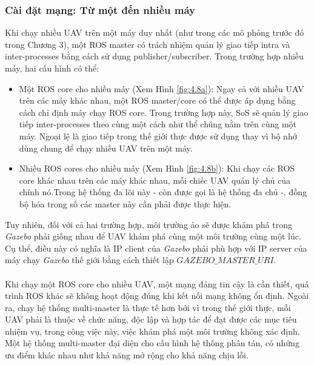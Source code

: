 \documentclass[11pt,openany]{book}
\begin{document}
\subsubsection{Cài đặt mạng: Từ một đến nhiều máy}
Khi chạy nhiều UAV trên một máy duy nhất (như trong các mô phỏng trước đó trong Chương 3), một ROS master có trách nhiệm quản lý giao tiếp intra và inter-processes bằng cách sử dụng publisher/subscriber. Trong trường hợp nhiều máy, hai cấu hình có thể:
\begin{itemize}
    \item Một ROS core cho nhiều máy (Xem Hình \ref{fig:4.8a}): Ngay cả với nhiều UAV trên các máy khác nhau, một ROS master/core có thể được áp dụng bằng cách chỉ định máy chạy ROS core. Trong trường hợp này, SoS sẽ quản lý giao tiếp inter-processes theo cùng một cách như thể chúng nằm trên cùng một máy. Ngoại lệ là giao tiếp trong thế giới thực được sử dụng thay vì bộ nhớ dùng chung để chạy nhiều UAV trên một máy.
    \item Nhiều ROS cores cho nhiều máy (Xem Hình \ref{fig:4.8b}): Khi chạy các ROS core khác nhau trên các máy khác nhau, mỗi chiếc UAV quản lý chủ của chính nó.Trong hệ thống đa lõi này - còn được gọi là hệ thống đa chủ -, đồng bộ hóa trong số các master này cần phải được thực hiện.
\end{itemize}
Tuy nhiên, đối với cả hai trường hợp, môi trường ảo sẽ được khám phá trong \textit{Gazebo} phải giống nhau để UAV khám phá cùng một môi trường cùng một lúc. Cụ thể, điều này có nghĩa là IP client của \textit{Gazebo} phải phù hợp với IP server của máy chạy \textit{Gazebo} thế giới bằng cách thiết lập $\textit{GAZEBO\_MASTER\_URI}$.\\\\
Khi chạy một ROS core cho nhiều UAV, một mạng đáng tin cậy là cần thiết, quá trình  ROS khác sẽ không hoạt động đúng khi kết nối mạng không ổn định. Ngoài ra, chạy hệ thống multi-master là thực tế hơn bởi vì trong thế giới thực, mỗi UAV phải là thuộc về chức năng, độc lập và hợp tác để đạt được các mục tiêu nhiệm vụ, trong công việc này, việc khám phá một môi trường không xác định. Một hệ thống multi-master đại diện cho cấu hình hệ thống phân tán, có những ưu điểm khác nhau như khả năng mở rộng cho khả năng chịu lỗi.
\end{document}
